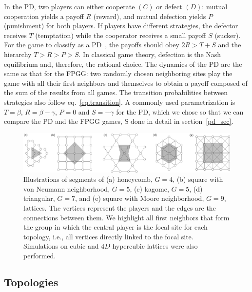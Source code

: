 \documentclass[5p,review]{elsarticle}
\begin{document}
In the PD, two players can either cooperate $(C)$ or defect $(D)$: mutual cooperation yields a payoff $R$ (reward), and mutual defection yields $P$ (punishment) for both players. If players have different strategies, the defector receives $T$ (temptation) while the cooperator receives a small payoff $S$ (sucker). For the game to classify as a PD~\cite{Nowak1992a, Szabo2007, perc_bs10}, the payoffs should obey $2R>T+S$ and the hierarchy $T>R>P>S$. 
%
In classical game theory, defection is the Nash equilibrium and, therefore, the rational choice.
%
 The dynamics of the PD are the same as that for the FPGG: two randomly chosen neighboring sites play the game with all their first neighbors and themselves to obtain a payoff composed of the sum of the results from all games. The transition probabilities between strategies also follow eq.~\ref{eq.transition}.
%
A commonly used parametrization is  $T = \beta$, $R =  \beta - \gamma$, $P = 0$ and $S = -\gamma$ for the PD, which we chose so that we can compare the PD and the FPGG games, S done in detail in section~\ref{pd_sec}.

\begin{figure}[htb]
    \centering
    \includegraphics[width=\linewidth]{figs/topologias2.jpg}
    \caption{Illustrations of segments of (a) honeycomb, $G=4$, (b) square with von Neumann neighborhood, $G=5$, (c) kagome, $G=5$, (d) triangular, $G=7$, and (e) square with Moore neighborhood, $G=9$, lattices. The vertices represent the players and the edges are the connections between them. We highlight all first neighbors that form the group in which the central player is the focal site for each topology, i.e., all vertices directly linked to the focal site. Simulations on cubic and $4D$ hypercubic lattices were also performed.}
    \label{topo}
\end{figure}


\subsection*{Topologies}
\label{sec.topologies}
\end{document}
